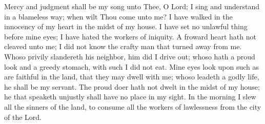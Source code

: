 Mercy and judgment shall be my song unto Thee, O Lord; I sing and understand in a blameless way; when wilt Thou come unto me? I have walked in the innocency of my heart in the midst of my house. I have set no unlawful thing before mine eyes; I have hated the workers of iniquity. A froward heart hath not cleaved unto me; I did not know the crafty man that turned away from me. Whoso privily slandereth his neighbor, him did I drive out; whoso hath a proud look and a greedy stomach, with such I did not eat. Mine eyes look upon such as are faithful in the land, that they may dwell with me; whoso leadeth a godly life, he shall be my servant. The proud doer hath not dwelt in the midst of my house; he that speaketh unjustly shall have no place in my sight. In the morning I slew all the sinners of the land, to consume all the workers of lawlessness from the city of the Lord.
